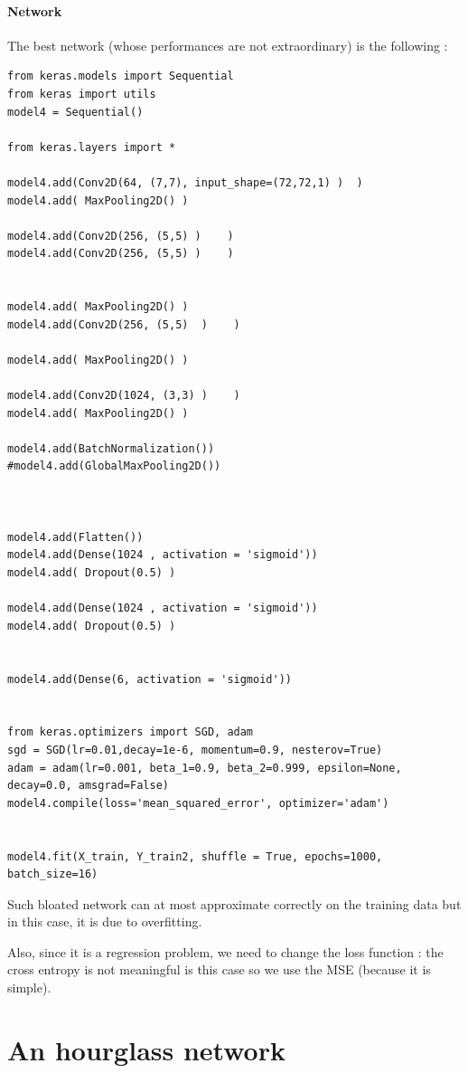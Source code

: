 \documentclass[]{article}
\begin{document}
\paragraph{Network}

The best network (whose performances are not extraordinary) is the following : 

\begin{verbatim}
from keras.models import Sequential 
from keras import utils
model4 = Sequential()

from keras.layers import *

model4.add(Conv2D(64, (7,7), input_shape=(72,72,1) )  )
model4.add( MaxPooling2D() )

model4.add(Conv2D(256, (5,5) )    )
model4.add(Conv2D(256, (5,5) )    )


model4.add( MaxPooling2D() )
model4.add(Conv2D(256, (5,5)  )    )

model4.add( MaxPooling2D() )

model4.add(Conv2D(1024, (3,3) )    )
model4.add( MaxPooling2D() )

model4.add(BatchNormalization())
#model4.add(GlobalMaxPooling2D())



model4.add(Flatten())
model4.add(Dense(1024 , activation = 'sigmoid'))
model4.add( Dropout(0.5) )

model4.add(Dense(1024 , activation = 'sigmoid'))
model4.add( Dropout(0.5) )


model4.add(Dense(6, activation = 'sigmoid'))


from keras.optimizers import SGD, adam
sgd = SGD(lr=0.01,decay=1e-6, momentum=0.9, nesterov=True) 
adam = adam(lr=0.001, beta_1=0.9, beta_2=0.999, epsilon=None, decay=0.0, amsgrad=False)
model4.compile(loss='mean_squared_error', optimizer='adam')


model4.fit(X_train, Y_train2, shuffle = True, epochs=1000, batch_size=16)

\end{verbatim}

Such bloated network can at most approximate correctly on the training data but in this case, it is due to overfitting.

Also, since it is a regression problem, we need to change the loss function : the cross entropy is not meaningful is this case so we use the MSE (because it is simple).

\section{An hourglass network}
\end{document}
